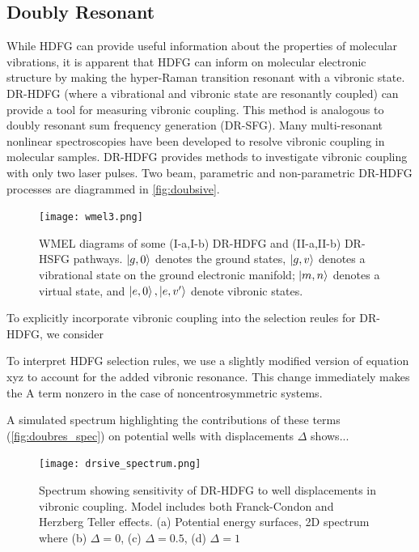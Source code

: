 \documentclass[aip, jcp, reprint, onecolumn]{revtex4-2}
\begin{document}
\subsection{Doubly Resonant}
While HDFG can provide useful information about the properties of molecular vibrations, it is apparent that HDFG can inform on molecular electronic structure by making the hyper-Raman transition resonant with a vibronic state.
DR-HDFG (where a vibrational and vibronic state are resonantly coupled) can provide a tool for measuring vibronic coupling.
This method is analogous to doubly resonant sum frequency generation (DR-SFG). \cite{Shen94}
Many multi-resonant nonlinear spectroscopies have been developed to resolve vibronic coupling in molecular samples. \cite{Carlson1990, Gaynor2017, RN276}
DR-HDFG provides methods to investigate vibronic coupling with only two laser pulses.
Two beam, parametric and non-parametric DR-HDFG processes are diagrammed in \autoref{fig:doubsive}.

\begin{figure}[!htbp]
	\centering
	\texttt{[image: wmel3.png]}
	\caption{WMEL diagrams of some (I-a,I-b) DR-HDFG and (II-a,II-b) DR-HSFG pathways. $\ket{g,0}$ denotes the ground states, $\ket{g,v}$ denotes a vibrational state on the ground electronic manifold; $\ket{m,n}$ denotes a virtual state, and $\ket{e,0}, \ket{e,v'}$ denote vibronic states.}
	\label{fig:doubsive}
\end{figure}

To explicitly incorporate vibronic coupling into the selection reules for DR-HDFG, we consider 

To interpret HDFG selection rules, we use a slightly modified version of equation xyz to account for the added vibronic resonance. 
This change immediately makes the A term nonzero in the case of noncentrosymmetric systems.

A simulated spectrum highlighting the contributions of these terms (\autoref{fig:doubres_spec}) on potential wells with displacements $\Delta$ shows... 
\begin{figure}[!htbp]
	\centering
	\texttt{[image: drsive\_spectrum.png]}
	\caption{Spectrum showing sensitivity of DR-HDFG to well displacements in vibronic coupling.
		Model includes both Franck-Condon and Herzberg Teller effects.
		(a) Potential energy surfaces, 2D spectrum where (b) $\Delta = 0$, (c) $\Delta = 0.5$, (d) $\Delta = 1$}
	\label{fig:doubres_spec}
\end{figure}
\end{document}
